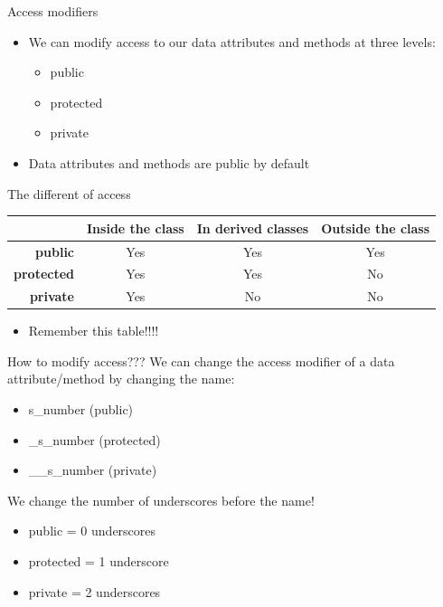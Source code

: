 \begin{frame}[fragile]{Access modifiers}
\begin{itemize}
    \item We can modify access to our data attributes and methods at three levels:
    \begin{itemize}
        \item public
        \item protected
        \item private
    \end{itemize}
    \item Data attributes and methods are public by default
\end{itemize}
\end{frame}

\begin{frame}{The different of access}
\begin{tabular}{rccc}
 & Inside the class & In derived classes & Outside the class\\\hline
\textbf{public} & Yes & Yes & Yes \\
\textbf{protected} & Yes & Yes & No \\
\textbf{private} & Yes & No & No \\
\end{tabular}
\pause
\begin{itemize}
    \item Remember this table!!!!
\end{itemize}
\end{frame}

\begin{frame}{How to modify access???}
We can change the access modifier of a data attribute/method by changing the name:
\begin{itemize}
    \item s\_number (public)
    \item \_s\_number (protected)
    \item \_\_s\_number (private)
\end{itemize}
\pause
We change the number of underscores before the name!
\begin{itemize}
    \item public = 0 underscores
    \item protected = 1 underscore
    \item private = 2 underscores
\end{itemize}
\end{frame}

